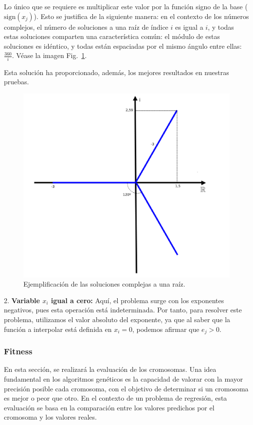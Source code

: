 \documentclass[conference,a4paper]{IEEEtran}
\def\figurename{Fig.}
\begin{document}
Lo único que se requiere es multiplicar este valor por la función signo de la base (\(\text{sign}(x_j)\)). Esto se justifica de la siguiente manera: en el contexto de los números complejos, el número de soluciones a una raíz de índice \(i\) es igual a \(i\), y todas estas soluciones comparten una característica común: el módulo de estas soluciones es idéntico, y todas están espaciadas por el mismo ángulo entre ellas: \(\frac{360}{i}\). Véase la imagen \figurename~\ref{fig:roots_example}.

Esta solución ha proporcionado, además, los mejores resultados en nuestras pruebas.


\begin{figure}[h]
    \centering
    \includegraphics[width=\columnwidth]{image-roots-example.jpg}
    \caption{Ejemplificación de las soluciones complejas a una raíz.}
    \label{fig:roots_example}
\end{figure}

2. \textbf{Variable \( x_i \) igual a cero:} Aquí, el problema surge con los exponentes negativos, pues esta operación está indeterminada. Por tanto, para resolver este problema, utilizamos el valor absoluto del exponente, ya que al saber que la función a interpolar está definida en \( x_i = 0 \), podemos afirmar que \( e_j > 0 \).


\subsubsection{Fitness}
En esta sección, se realizará la evaluación de los cromosomas. Una idea fundamental en los algoritmos genéticos es la capacidad de valorar con la mayor precisión posible cada cromosoma, con el objetivo de determinar si un cromosoma es mejor o peor que otro. En el contexto de un problema de regresión, esta evaluación se basa en la comparación entre los valores predichos por el cromosoma y los valores reales.
\end{document}
